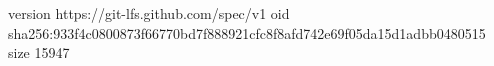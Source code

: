 version https://git-lfs.github.com/spec/v1
oid sha256:933f4c0800873f66770bd7f888921cfc8f8afd742e69f05da15d1adbb0480515
size 15947

